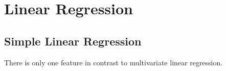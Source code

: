 \section[][customSectionColor]{Linear Regression}
\subsection{Simple Linear Regression}
There is only one feature in contrast to multivariate linear regression.


